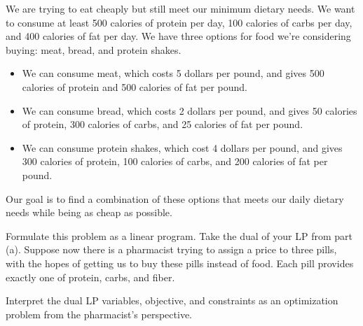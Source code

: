 \documentclass{article}
\begin{document}

We are trying to eat cheaply but still meet our minimum dietary needs. We want to consume at least 500 calories of protein per day, 100 calories of carbs per day, and 400 calories of fat per day. We have three options for food we're considering buying: meat, bread, and protein shakes.

\begin{itemize}
\item We can consume meat, which costs 5 dollars per pound, and gives 500 calories of protein and 500 calories of fat per pound.
\item We can consume bread, which costs 2 dollars per pound, and gives 50 calories of protein, 300 calories of carbs, and 25 calories of fat per pound.
\item We can consume protein shakes, which cost 4 dollars per pound, and gives 300 calories of protein, 100 calories of carbs, and 200 calories of fat per pound.
\end{itemize}

Our goal is to find a combination of these options that meets our daily dietary needs while being as cheap as possible.

\begin{subparts}
\subpart Formulate this problem as a linear program.
\subpart Take the dual of your LP from part (a).
\subpart Suppose now there is a pharmacist trying to assign a price to three pills, with the hopes of getting us to buy these pills instead of food. Each pill provides exactly one of protein, carbs, and fiber.

Interpret the dual LP variables, objective, and constraints as an optimization problem from the pharmacist's perspective.
\end{subparts}
\end{document}

